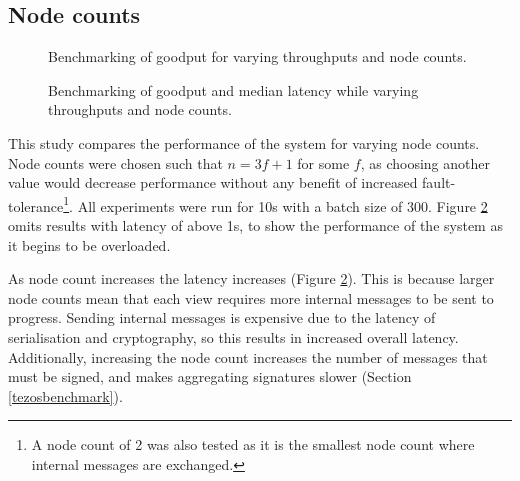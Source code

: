 
\subsection{Node counts} \label{nodecountseval}

\begin{figure}[h!]
\centering
\resizebox{.6\textwidth}{!}{}
\caption{Benchmarking of goodput for varying throughputs and node counts.}
\label{throughputgoodputnodes}
\end{figure}

\begin{figure}[h!]
\centering
\resizebox{.6\textwidth}{!}{}
\caption{Benchmarking of goodput and median latency while varying throughputs and node counts.}
\label{goodputlatencynodes}
\end{figure}

% 

This study compares the performance of the system for varying node counts. Node counts were chosen such that $n = 3f + 1$ for some $f$, as choosing another value would decrease performance without any benefit of increased fault-tolerance\footnote{A node count of 2 was also tested as it is the smallest node count where internal messages are exchanged.}. All experiments were run for 10s with a batch size of 300. Figure \ref{goodputlatencynodes} omits results with latency of above 1s, to show the performance of the system as it begins to be overloaded.

As node count increases the latency increases (Figure \ref{goodputlatencynodes}). This is because larger node counts mean that each view requires more internal messages to be sent to progress. Sending internal messages is expensive due to the latency of serialisation and cryptography, so this results in increased overall latency. Additionally, increasing the node count increases the number of messages that must be signed, and makes aggregating signatures slower (Section \ref{tezosbenchmark}).


